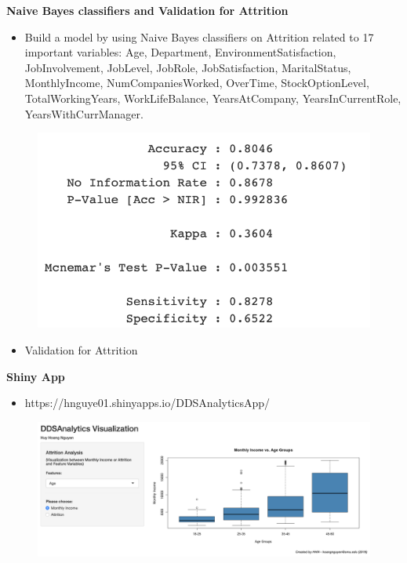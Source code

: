 \documentclass[notes,11pt]{beamer}
\begin{document}
\begin{frame}
\begin{center}
\textbf{\color{blue}\Large{Naive Bayes classifiers  and Validation for Attrition}}
\end{center}
\begin{itemize}
\item<1-> Build a model by using Naive Bayes classifiers  on Attrition related to 17 important variables: Age, Department, EnvironmentSatisfaction, JobInvolvement, JobLevel, JobRole, JobSatisfaction, MaritalStatus, MonthlyIncome, NumCompaniesWorked, OverTime, StockOptionLevel, TotalWorkingYears, WorkLifeBalance, YearsAtCompany, YearsInCurrentRole, YearsWithCurrManager.
\end{itemize}
\begin{figure}
\includegraphics[scale=0.3]{PIC11}
\end{figure}
\begin{itemize}
\item<1-> Validation for Attrition
\end{itemize}
\end{frame}



\begin{frame}
\begin{center}
\textbf{\color{blue}\Large{Shiny App}}
\end{center}
\begin{itemize}
\item<1-> https://hnguye01.shinyapps.io/DDSAnalyticsApp/
\end{itemize}
\begin{figure}
\includegraphics[scale=0.25]{PIC12}
\end{figure}
\end{frame}
\end{document}
